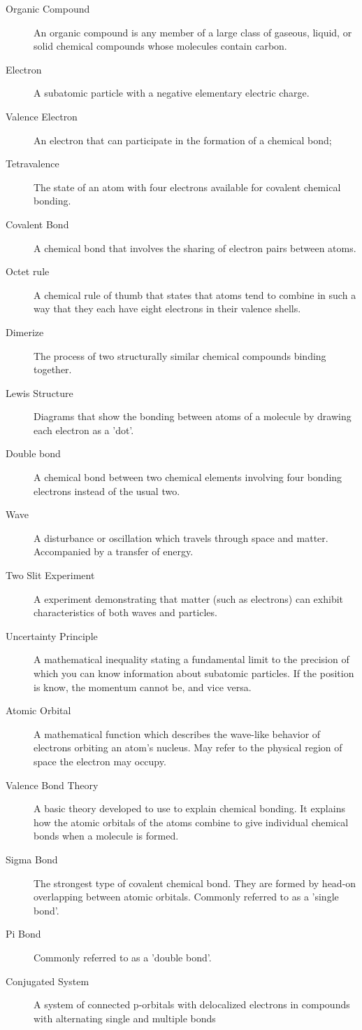 \documentclass[12pt]{article}
\begin{document}
\begin{description}
\item[Organic Compound] An organic compound is any member of a large class of gaseous, liquid, or solid chemical compounds whose molecules contain carbon.
\item[Electron] A subatomic particle with a negative elementary electric charge. 
\item[Valence Electron] An electron that can participate in the formation of a chemical bond; 
\item[Tetravalence] The state of an atom with four electrons available for covalent chemical bonding.
\item[Covalent Bond] A chemical bond that involves the sharing of electron pairs between atoms.
\item[Octet rule] A chemical rule of thumb that states that atoms tend to combine in such a way that they each have eight electrons in their valence shells.
\item[Dimerize] The process of two structurally similar chemical compounds binding together.
\item[Lewis Structure] Diagrams that show the bonding between atoms of a molecule by drawing each electron as a 'dot'.
\item[Double bond] A chemical bond between two chemical elements involving four bonding electrons instead of the usual two.
\item[Wave] A disturbance or oscillation which travels through space and matter. Accompanied by a transfer of energy.
\item[Two Slit Experiment] A experiment demonstrating that matter (such as electrons) can exhibit characteristics of both waves and particles.
\item[Uncertainty Principle] A mathematical inequality stating a fundamental limit to the precision of which you can know information about subatomic particles. If the position is know, the momentum cannot be, and vice versa.
\item[Atomic Orbital] A mathematical function which describes the wave-like behavior of electrons orbiting an atom's nucleus. May refer to the physical region of space the electron may occupy.
\item[Valence Bond Theory] A basic theory developed to use to explain chemical bonding. It explains how the atomic orbitals of the atoms combine to give individual chemical bonds when a molecule is formed. 
\item[Sigma Bond] The strongest type of covalent chemical bond. They are formed by head-on overlapping between atomic orbitals. Commonly referred to as a 'single bond'.
\item[Pi Bond] Commonly referred to as a 'double bond'.
\item[Conjugated System] A system of connected p-orbitals with delocalized electrons in compounds with alternating single and multiple bonds
\end{description}
\end{document}
